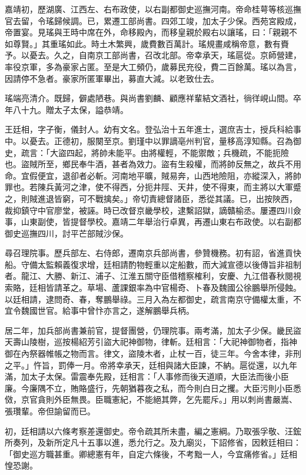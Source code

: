 \begin{pinyinscope}
嘉靖初，歷湖廣、江西左、右布政使，以右副都御史巡撫河南。帝命桂萼等核巡撫官去留，令瑤歸候調。已，累遷工部尚書。四郊工竣，加太子少保。西苑宮殿成，帝置宴。見瑤與王時中席在外，命移殿內，而移皇親於殿右以讓瑤，曰：「親親不如尊賢。」其重瑤如此。時土木繁興，歲費數百萬計。瑤規畫咸稱帝意，數有賚予。以憂去。久之，自南京工部尚書，召改北部。帝幸承天，瑤扈從。京師營建，率役京軍，多為豪家占匿。至是大工頻仍，歲募民充役，費二百餘萬。瑤以為言，因請停不急者。豪家所匿軍畢出，募直大減。以老致仕去。

瑤端亮清介。既歸，僻處陋巷。與尚書劉麟、顧應祥輩結文酒社，徜徉峴山間。卒年八十九。贈太子太保，謚恭靖。

王廷相，字子衡，儀封人。幼有文名。登弘治十五年進士，選庶吉士，授兵科給事中。以憂去。正德初，服闋至京。劉瑾中以罪謫亳州判官，量移高淳知縣。召為御史，疏言：「大盜四起，將帥未能平。由將權輕，不能禦敵；兵機疏，不能扼險也。盜賊所至，鄉民奉牛酒，甚者為效力。盜有生殺權，而將帥反無之，故兵不用命。宜假便宜，退卻者必斬。河南地平曠，賊易奔，山西地險阻，亦縱深入，將帥罪也。若陳兵黃河之津，使不得西，分扼井陘、天井，使不得東，而主將以大軍蹙之，則賊進退皆窮，可不戰擒矣。」帝切責總督諸臣，悉從其議。已，出按陜西，裁抑鎮守中官廖堂，被誣。時已改督京畿學校，逮繫詔獄，謫贛榆丞。屢遷四川僉事，山東副使，皆提督學校。嘉靖二年舉治行卓異，再遷山東右布政使。以右副都御史巡撫四川，討平芒部賊沙保。

尋召理院事。歷兵部左、右侍郎，遷南京兵部尚書，參贊機務。初有詔，省進貢快船。守備太監賴義復求增，廷相請酌物輕重以定船數，而大減宣德以後傳旨非祖制者。龍江、大勝、新江、浦子、江淮五關守臣借稽察榷利，安慶、九江借春秋閱視索賂，廷相皆請革之。草場、蘆課銀率為中官楊奇、卜春及魏國公徐鵬舉所侵蝕。以廷相請，逮問奇、春，奪鵬舉祿。三月入為左都御史，疏言南京守備權太重，不宜令魏國世官。給事中曾忭亦言之，遂解鵬舉兵柄。

居二年，加兵部尚書兼前官，提督團營，仍理院事。兩考滿，加太子少保。畿民盜天壽山陵樹，巡按楊紹芳引盜大祀神御物，律斬。廷相言：「大祀神御物者，指神御在內祭器帷帳之物而言。律文，盜陵木者，止杖一百，徒三年。今舍本律，非刑之平。」忤旨，罰俸一月。帝將幸承天，廷相與諸大臣諫，不納。扈從還，以九年滿，加太子太保。雷震奉先殿，廷相言：「人事修而後天道順，大臣法而後小臣廉。今廉隅不立，賄賂盛行，先朝猶暮夜之私，而今則白日之攫。大臣污則小臣悉傚，京官貪則外臣無畏。臣職憲紀，不能絕其弊，乞先罷斥。」用以刺尚書嚴嵩、張瓚輩。帝但諭留而已。

初，廷相請以六條考察差還御史。帝令疏其所未盡，編之憲綱。乃取張孚敬、汪鋐所奏列，及新所定凡十五事以進，悉允行之。及九廟災，下詔修省，因敕廷相曰：「御史巡方職甚重。卿總憲有年，自定六條後，不考黜一人，今宜痛修省。」廷相惶恐謝。


\end{pinyinscope}
